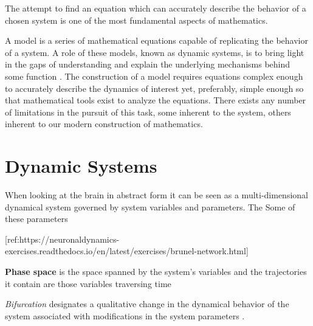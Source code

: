 \documentclass[../../Orator.tex]{subfiles}
\begin{document}
The attempt to find an equation which can accurately describe the behavior of a chosen system is one of the most fundamental aspects of mathematics.

A model is a series of mathematical equations capable of replicating the behavior of a system. A role of these models, known as dynamic systems, is to bring light in the gaps of understanding and explain the underlying mechanisms behind some function \citelater. 
The construction of a model requires equations complex enough to accurately describe the dynamics of interest yet, preferably, simple enough so that mathematical tools exist to analyze the equations\footnotemark. 
There exists any number of limitations in the pursuit of this task, some inherent to the system, others inherent to our modern construction of mathematics.

\section{Dynamic Systems}

When looking at the brain in abstract form it can be seen as a multi-dimensional dynamical system governed by system variables and parameters.
The 
Some of these parameters

\begin{split}\left[\begin{array}{ccll}
{\displaystyle \frac{du}{dt}} &=& u\left(1-u^{2}\right)-w+I \equiv F(u,w)\\[.2cm]
{\displaystyle \frac{dw}{dt}} &=& \varepsilon \left(u -0.5w+1\right) \equiv \varepsilon G(u,w)\, ,\\
\end{array}\right.\end{split}
[ref:https://neuronaldynamics-exercises.readthedocs.io/en/latest/exercises/brunel-network.html]

\textbf{Phase space} is the space spanned by the system's variables and the trajectories it contain are those variables traversing time

\textit{Bifurcation} designates a qualitative change in the dynamical behavior of the system associated with modifications in the system parameters \cite{STEFANESCU2012748}.
\end{document}
